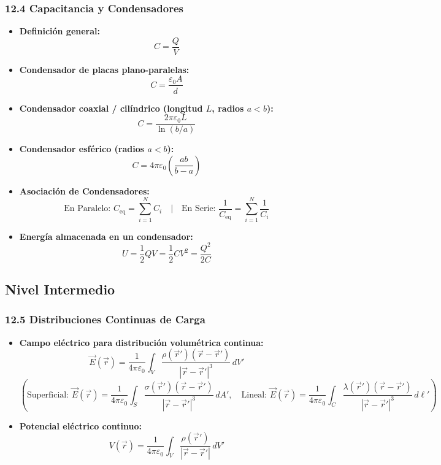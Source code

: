 \documentclass[11pt,a4paper]{article}
\begin{document}
\subsubsection*{12.4 Capacitancia y Condensadores}

\begin{itemize}
  \item \textbf{Definición general:}
  \[
    C = \frac{Q}{V}
  \]
  \item \textbf{Condensador de placas plano-paralelas:}
  \[
    C = \frac{\varepsilon_0 A}{d}
  \]
  \item \textbf{Condensador coaxial / cilíndrico (longitud $L$, radios $a < b$):}
  \[
    C = \frac{2\pi\varepsilon_0 L}{\ln(b/a)}
  \]
  \item \textbf{Condensador esférico (radios $a < b$):}
  \[
    C = 4\pi\varepsilon_0 \left( \frac{a b}{b - a} \right)
  \]
  \item \textbf{Asociación de Condensadores:}
  \[
    \text{En Paralelo: } C_{\text{eq}} = \sum_{i=1}^N C_i \quad | \quad \text{En Serie: } \frac{1}{C_{\text{eq}}} = \sum_{i=1}^N \frac{1}{C_i}
  \]
  \item \textbf{Energía almacenada en un condensador:}
  \[
    U = \frac{1}{2} Q V = \frac{1}{2} C V^2 = \frac{Q^2}{2C}
  \]
\end{itemize}

\subsection*{Nivel Intermedio}

\subsubsection*{12.5 Distribuciones Continuas de Carga}

\begin{itemize}
  \item \textbf{Campo eléctrico para distribución volumétrica continua:}
  \[
    \vec{E}(\vec{r}) = \frac{1}{4\pi\varepsilon_0} \int_V \frac{\rho(\vec{r}')(\vec{r} - \vec{r}')}{|\vec{r} - \vec{r}'|^3} \, dV'
  \]
  \[
    \left( \text{Superficial: } \vec{E}(\vec{r}) = \frac{1}{4\pi\varepsilon_0} \int_S \frac{\sigma(\vec{r}')(\vec{r} - \vec{r}')}{|\vec{r} - \vec{r}'|^3} \, dA', \quad \text{Lineal: } \vec{E}(\vec{r}) = \frac{1}{4\pi\varepsilon_0} \int_C \frac{\lambda(\vec{r}')(\vec{r} - \vec{r}')}{|\vec{r} - \vec{r}'|^3} \, d\ell' \right)
  \]
  \item \textbf{Potencial eléctrico continuo:}
  \[
    V(\vec{r}) = \frac{1}{4\pi\varepsilon_0} \int_V \frac{\rho(\vec{r}')}{|\vec{r} - \vec{r}'|} \, dV'
  \]
\end{itemize}
\end{document}
